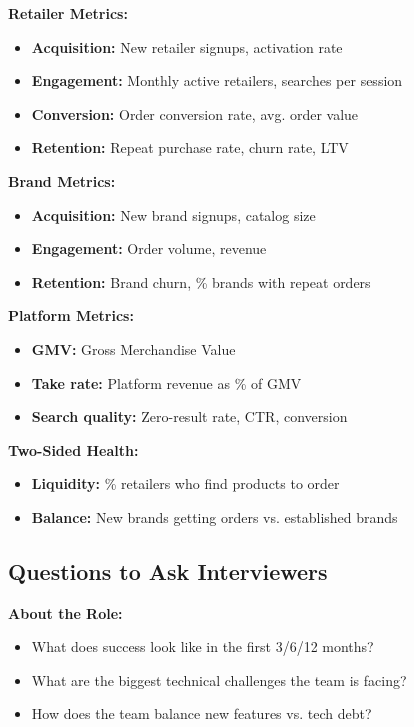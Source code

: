 \documentclass[11pt,letterpaper]{article}
\begin{document}
\textbf{Retailer Metrics:}
\begin{itemize}
    \item \textbf{Acquisition:} New retailer signups, activation rate
    \item \textbf{Engagement:} Monthly active retailers, searches per session
    \item \textbf{Conversion:} Order conversion rate, avg. order value
    \item \textbf{Retention:} Repeat purchase rate, churn rate, LTV
\end{itemize}

\textbf{Brand Metrics:}
\begin{itemize}
    \item \textbf{Acquisition:} New brand signups, catalog size
    \item \textbf{Engagement:} Order volume, revenue
    \item \textbf{Retention:} Brand churn, \% brands with repeat orders
\end{itemize}

\textbf{Platform Metrics:}
\begin{itemize}
    \item \textbf{GMV:} Gross Merchandise Value
    \item \textbf{Take rate:} Platform revenue as \% of GMV
    \item \textbf{Search quality:} Zero-result rate, CTR, conversion
\end{itemize}

\textbf{Two-Sided Health:}
\begin{itemize}
    \item \textbf{Liquidity:} \% retailers who find products to order
    \item \textbf{Balance:} New brands getting orders vs. established brands
\end{itemize}

\subsection{Questions to Ask Interviewers}

\textbf{About the Role:}
\begin{itemize}
    \item What does success look like in the first 3/6/12 months?
    \item What are the biggest technical challenges the team is facing?
    \item How does the team balance new features vs. tech debt?
\end{itemize}
\end{document}
